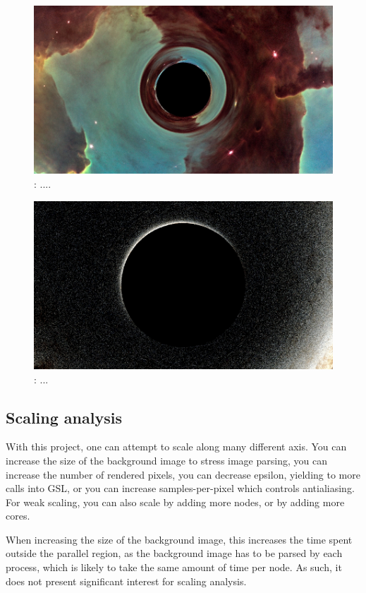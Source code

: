 \begin{figure}[h]
  \centering
  \includegraphics[width=0.8\linewidth]{figs/eagle_render}
  \caption{: ....}
    \label{fig:eagle}
\end{figure}

\begin{figure}[h]
  \centering
  \includegraphics[width=0.8\linewidth]{figs/starry_render}
  \caption{: ...}
    \label{fig:starry}
\end{figure}




\subsection{Scaling analysis}

With this project, one can attempt to scale along many different axis. You can increase the size of the background image to stress image parsing, you can increase the number of rendered pixels, you can decrease epsilon, yielding to more calls into GSL, or you can increase samples-per-pixel which controls antialiasing. For weak scaling, you can also scale by adding more nodes, or by adding more cores. 

When increasing the size of the background image, this increases the time spent outside the parallel region, as the background image has to be parsed by each process, which is likely to take the same amount of time per node. As such, it does not present significant interest for scaling analysis.

